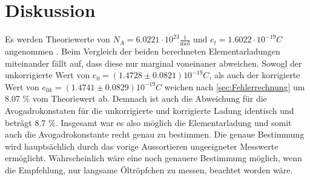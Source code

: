 \section{Diskussion}
\label{sec:Diskussion}
Es werden Theoriewerte von $N_A = 6.0221 \cdot 10^{23} \frac{1}{\text{mol}}$ \cite{3} und $e_t=1.6022 \cdot 10^{-19} C$ angenommen \cite{4}.
Beim Vergleich der beiden berechneten Elementarladungen miteinander 
fällt auf, dass diese nur marginal voneinaner abweichen.
Sowogl der unkorrigierte Wert von $e_0=(1.4728 \pm 0.0821) 10^{-19} C$, als auch 
der korrigierte Wert von
$e_{0k}=(1.4741 \pm 0.0829) 10^{-19}C$ weichen nach \ref{sec:Fehlerrechnung}
um 8.07 \% vom Theoriewert ab. Demnach ist auch die Abweichung für
die Avogadrokonstaten für die unkorrigierte und korrigierte Ladung
identisch und beträgt 8.7 \%. 
Insgesamt war es also möglich die Elementarladung und somit auch die
Avogadrokonstante recht genau zu bestimmen. Die genaue Bestimmung wird hauptsächlich
durch das vorige Aussortieren ungeeigneter Messwerte ermöglicht. 
Wahrscheinlich wäre eine noch genauere Bestimmung möglich, wenn die 
Empfehlung, nur langsame Öltröpfchen zu messen, beachtet worden wäre. 



